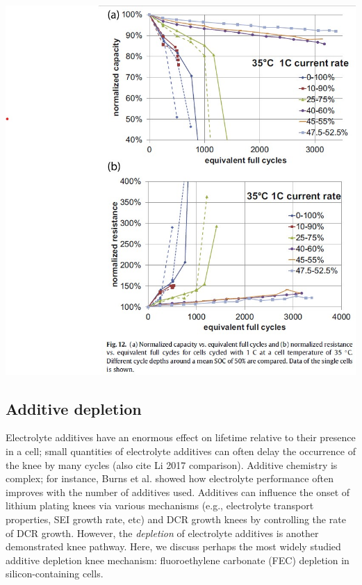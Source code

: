 \documentclass{article}
\begin{document}
\hfil\includegraphics[scale=0.5]{images/Ecker_2014_fig12.jpg}

\subsection{Additive depletion}

Electrolyte additives have an enormous effect on lifetime relative to their presence in a cell; small quantities of electrolyte additives can often delay the occurrence of the knee by many cycles\cite{ma_editors_2019} (also cite Li 2017 comparison). Additive chemistry is complex; for instance, Burns et al.\cite{burns_predicting_2013} showed how electrolyte performance often improves with the number of additives used. Additives can influence the onset of lithium plating knees via various mechanisms (e.g., electrolyte transport properties, SEI growth rate, etc) and DCR growth knees by controlling the rate of DCR growth\cite{ma_editors_2019}. However, the \emph{depletion} of electrolyte additives is another demonstrated knee pathway. Here, we discuss perhaps the most widely studied additive depletion knee mechanism: fluoroethylene carbonate (FEC) depletion in silicon-containing cells.
\end{document}
